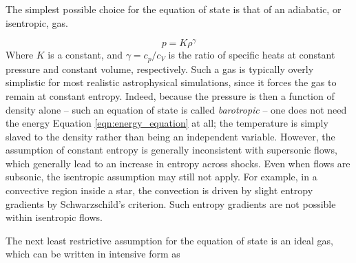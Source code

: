 \documentclass[notoc]{tufte-handout}
\begin{document}
The simplest possible choice for the equation of state is that of an adiabatic, or isentropic, gas.

\begin {equation}
p = K \rho^{\gamma}
\end {equation}
%
Where $K$ is a constant, and $\gamma = c_p / c_V$ is the ratio of specific heats at constant pressure and constant volume, respectively. Such a gas is typically overly simplistic for most realistic astrophysical simulations, since it forces the gas to remain at constant entropy. Indeed, because the pressure is then a function of density alone -- such an equation of state is called {\it barotropic} -- one does not need the energy Equation \ref {eqn:energy_equation} at all; the temperature is simply slaved to the density rather than being an independent variable.  However, the assumption of constant entropy is generally inconsistent with supersonic flows, which generally lead to an increase in entropy across shocks. Even when flows are subsonic, the isentropic assumption may still not apply. For example, in a convective region inside a star, the convection is driven by slight entropy gradients by Schwarzschild's criterion. Such entropy gradients are not possible within isentropic flows.

The next least restrictive assumption for the equation of state is an ideal gas, which can be written in intensive form as
\end{document}
